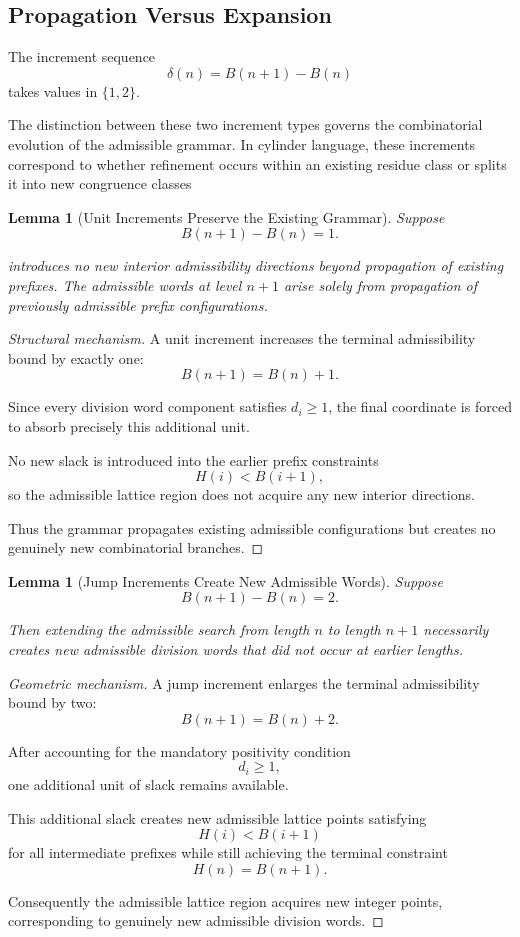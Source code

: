 \documentclass[12pt, oneside]{article}
\numberwithin{equation}{section}
\theoremstyle{definition}
\theoremstyle{plain}
\newtheorem{lemma}[theorem]{Lemma}
\theoremstyle{remark}
\begin{document}
\subsection{Propagation Versus Expansion}

The increment sequence
\[
\delta(n)=B(n+1)-B(n)
\]
takes values in \(\{1,2\}\).

The distinction between these two increment types governs the
combinatorial evolution of the admissible grammar.  In cylinder
language, these increments correspond to whether refinement
occurs within an existing residue class or splits it into new
congruence classes

\begin{lemma}[Unit Increments Preserve the Existing Grammar]
\label{lem:single-no-new}
Suppose
\[
B(n+1)-B(n)=1.
\]

introduces no new interior admissibility directions beyond propagation
of existing prefixes. The admissible words at level \(n+1\) arise solely
from propagation of previously admissible prefix configurations.
\end{lemma}

\begin{proof}[Structural mechanism]
A unit increment increases the terminal admissibility bound by exactly
one:
\[
B(n+1)=B(n)+1.
\]

Since every division word component satisfies \(d_i\ge1\), the final
coordinate is forced to absorb precisely this additional unit.

No new slack is introduced into the earlier prefix constraints
\[
H(i)<B(i+1),
\]
so the admissible lattice region does not acquire any new interior
directions.

Thus the grammar propagates existing admissible configurations but
creates no genuinely new combinatorial branches.
\end{proof}

\begin{lemma}[Jump Increments Create New Admissible Words]
\label{lem:jump-new-words}
Suppose
\[
B(n+1)-B(n)=2.
\]

Then extending the admissible search from length \(n\) to length
\(n+1\) necessarily creates new admissible division words that did
not occur at earlier lengths.
\end{lemma}

\begin{proof}[Geometric mechanism]
A jump increment enlarges the terminal admissibility bound by two:
\[
B(n+1)=B(n)+2.
\]

After accounting for the mandatory positivity condition
\[
d_i\ge1,
\]
one additional unit of slack remains available.

This additional slack creates new admissible lattice points satisfying
\[
H(i)<B(i+1)
\]
for all intermediate prefixes while still achieving the terminal
constraint
\[
H(n)=B(n+1).
\]

Consequently the admissible lattice region acquires new integer points,
corresponding to genuinely new admissible division words.
\end{proof}
\end{document}
